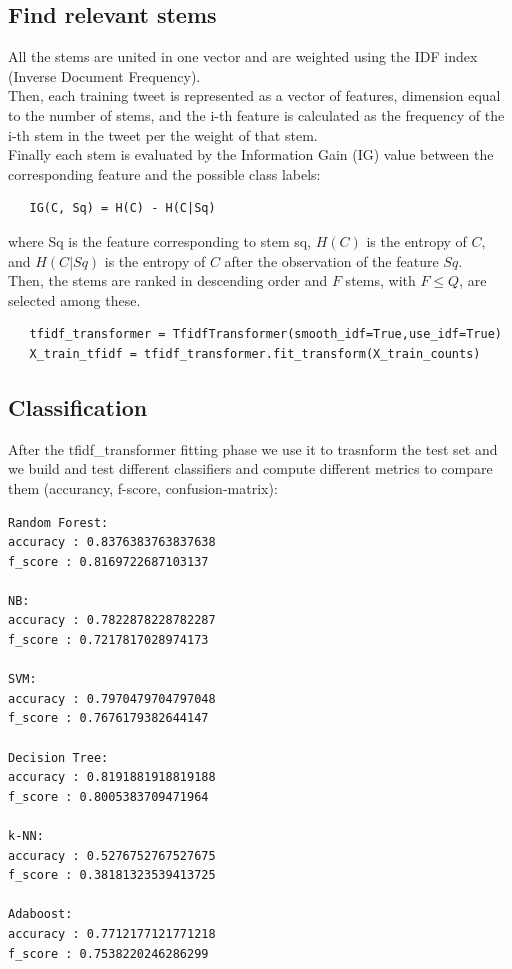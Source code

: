\documentclass[a4paper]{article}
\begin{document}
\subsection{Find relevant stems}
All the stems are united in one vector and are weighted using the IDF index (Inverse Document Frequency).\\
Then, each training tweet is represented as a vector of features, dimension equal to the number of stems, and the i-th feature is calculated as the frequency of the i-th stem in the tweet per the weight of that stem.\\
Finally each stem is evaluated by the Information Gain (IG) value between the corresponding feature and the possible class labels:
\begin{verbatim}
   IG(C, Sq) = H(C) - H(C|Sq)
\end{verbatim}
where Sq is the feature corresponding to stem sq, $H(C)$ is the entropy of $C$, and $H(C|Sq)$ is the entropy of $C$ after the observation of the feature $Sq$.\\
Then, the stems are ranked in descending order and $F$ stems, with $F \leq Q$, are selected among these.
\begin{verbatim}
   tfidf_transformer = TfidfTransformer(smooth_idf=True,use_idf=True)
   X_train_tfidf = tfidf_transformer.fit_transform(X_train_counts)
\end{verbatim}

\subsection{Classification}
After the tfidf\_transformer fitting phase we use it to trasnform the test set and we build and test different classifiers and compute different metrics to compare them (accurancy, f-score, confusion-matrix):
\begin{verbatim}
Random Forest:
accuracy : 0.8376383763837638
f_score : 0.8169722687103137

NB:
accuracy : 0.7822878228782287
f_score : 0.7217817028974173

SVM:
accuracy : 0.7970479704797048
f_score : 0.7676179382644147

Decision Tree:
accuracy : 0.8191881918819188
f_score : 0.8005383709471964

k-NN:
accuracy : 0.5276752767527675
f_score : 0.38181323539413725

Adaboost:
accuracy : 0.7712177121771218
f_score : 0.7538220246286299
\end{verbatim}
\end{document}

